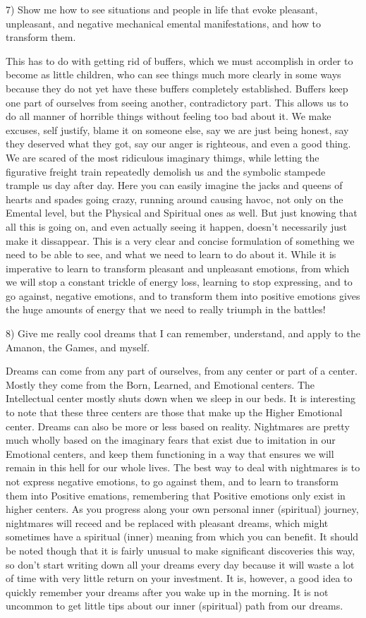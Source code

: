 \documentclass[12pt,letterpaper]{book}
\begin{document}
7) Show me how to see situations and people in life that evoke pleasant, unpleasant, and negative mechanical emental manifestations, and how to transform them.

This has to do with getting rid of buffers, which we must accomplish in order to become as little children, who can see things much more clearly in some ways because they do not yet have these buffers completely established. Buffers keep one part of ourselves from seeing another, contradictory part. This allows us to do all manner of horrible things without feeling too bad about it. We make excuses, self justify, blame it on someone else, say we are just being honest, say they deserved what they got, say our anger is righteous, and even a good thing. We are scared of the most ridiculous imaginary thimgs, while letting the figurative freight train repeatedly demolish us and the symbolic stampede trample us day after day. Here you can easily imagine the jacks and queens of hearts and spades going crazy, running around causing havoc, not only on the Emental level, but the Physical and Spiritual ones as well. But just knowing that all this is going on, and even actually seeing it happen, doesn't necessarily just make it dissappear. This is a very clear and concise formulation of something we need to be able to see, and what we need to learn to do about it. While it is imperative to learn to transform pleasant and unpleasant emotions, from which we will stop a constant trickle of energy loss, learning to stop expressing, and to go against, negative emotions, and to transform them into positive emotions gives the huge amounts of energy that we need to really triumph in the battles! 

8) Give me really cool dreams that I can remember, understand, and apply to the Amanon, the Games, and myself.

Dreams can come from any part of ourselves, from any center or part of a center. Mostly they come from the Born, Learned, and Emotional centers. The Intellectual center mostly shuts down when we sleep in our beds. It is interesting to note that these three centers are those that make up the Higher Emotional center. Dreams can also be more or less based on reality. Nightmares are pretty much wholly based on the imaginary fears that exist due to imitation in our Emotional centers, and keep them functioning in a way that ensures we will remain in this hell for our whole lives. The best way to deal with nightmares is to not express negative emotions, to go against them, and to learn to transform them into Positive emations, remembering that Positive emotions only exist in higher centers. As you progress along your own personal inner (spiritual) journey, nightmares will receed and be replaced with pleasant dreams, which might sometimes have a spiritual (inner) meaning from which you can benefit. It should be noted though that it is fairly unusual to make significant discoveries this way, so don't start writing down all your dreams every day because it will waste a lot of time with very little return on your investment. It is, however, a good idea to quickly remember your dreams after you wake up in the morning. It is not uncommon to get little tips about our inner (spiritual) path from our dreams.
\end{document}
